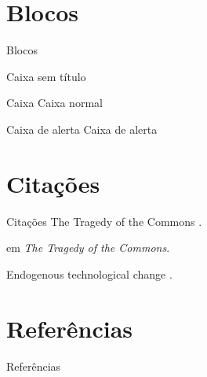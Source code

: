 \documentclass[
    brazil,
    ]{beamer}
\begin{document}
\section{Blocos}
\begin{frame}{Blocos}
    \begin{block}{}
        Caixa sem título
    \end{block}
    \begin{block}{Caixa}
        Caixa normal
    \end{block}
    \begin{alertblock}{Caixa de alerta}
        Caixa de alerta
    \end{alertblock}
\end{frame}

\section{Citações}
\begin{frame}{Citações}
    The Tragedy of the Commons \cite{Hardin1968}. \par
     em \textit{The Tragedy of the Commons}. \par
    Endogenous technological change \cite{romer1990endogenous}.
\end{frame}

\section{Referências}
\begin{frame}{Referências}
    \footnotesize
\end{frame}
\end{document}
